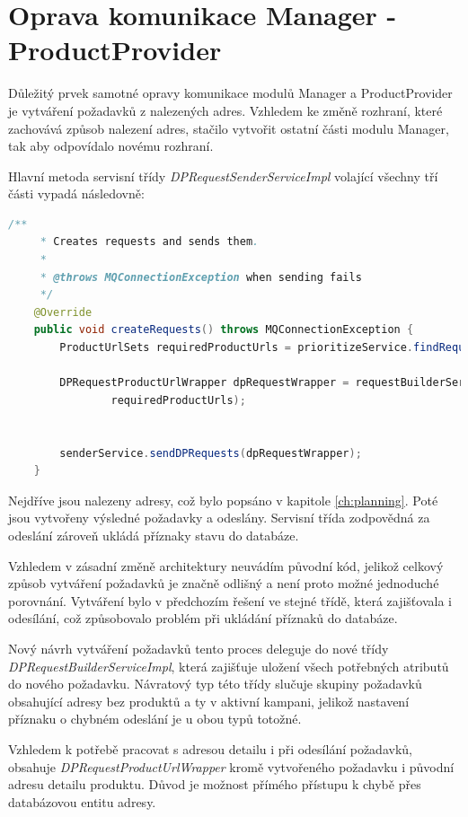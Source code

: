 \documentclass[thesis=B,czech]{FITthesis}[2012/06/26]
\begin{document}
\section{Oprava komunikace Manager - ProductProvider}
Důležitý prvek samotné opravy komunikace modulů Manager a ProductProvider je vytváření požadavků z nalezených adres.
Vzhledem ke změně rozhraní, které zachovává způsob nalezení adres, stačilo vytvořit ostatní části modulu Manager, tak aby odpovídalo novému rozhraní.
\par
Hlavní metoda servisní třídy \textit{DPRequestSenderServiceImpl} volající všechny tří části vypadá následovně:
\begin{lstlisting}[language=Java]
    /**
     * Creates requests and sends them.
     *
     * @throws MQConnectionException when sending fails
     */
    @Override
    public void createRequests() throws MQConnectionException {
        ProductUrlSets requiredProductUrls = prioritizeService.findRequiredProductUrls();

        DPRequestProductUrlWrapper dpRequestWrapper = requestBuilderService.create(
                requiredProductUrls);


        senderService.sendDPRequests(dpRequestWrapper);
    }
\end{lstlisting}
Nejdříve jsou nalezeny adresy, což bylo popsáno v kapitole \ref{ch:planning}. Poté jsou vytvořeny výsledné požadavky
a odeslány. Servisní třída zodpovědná za odeslání zároveň ukládá příznaky stavu do databáze.
\par
Vzhledem v zásadní změně architektury neuvádím původní kód, jelikož celkový způsob vytváření požadavků je značně odlišný a není proto možné jednoduché porovnání. Vytváření bylo v předchozím řešení ve stejné třídě, která zajišťovala i odesílání, což způsobovalo problém při ukládání příznaků do databáze.
\par
Nový návrh vytváření požadavků tento proces deleguje do nové 
třídy  \\ \textit{DPRequestBuilderServiceImpl}, která zajišťuje uložení všech potřebných atributů do nového požadavku. Návratový typ této třídy slučuje skupiny požadavků obsahující adresy bez produktů a ty v aktivní kampani, jelikož nastavení příznaku o chybném odeslání je u obou typů
totožné.
\par
Vzhledem k potřebě pracovat s adresou detailu i při odesílání požadavků, obsahuje \textit{DPRequestProductUrlWrapper} kromě vytvořeného požadavku
i původní adresu detailu produktu. Důvod je možnost přímého přístupu k chybě přes databázovou entitu adresy.
\end{document}
